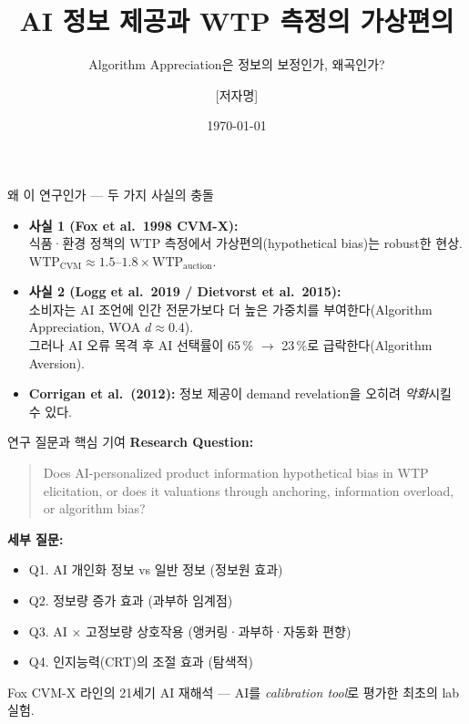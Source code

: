 \documentclass[aspectratio=169]{beamer}
\title{AI 정보 제공과 WTP 측정의 가상편의}
\subtitle{Algorithm Appreciation은 정보의 보정인가, 왜곡인가?}
\author{[저자명]}
\institute{[소속]}
\date{\today}
\begin{document}

\frame{\titlepage}

\begin{frame}{왜 이 연구인가 --- 두 가지 사실의 충돌}
  \begin{itemize}
    \item \textbf{사실 1 (Fox et al.\ 1998 CVM-X):}\\
      식품·환경 정책의 WTP 측정에서 가상편의(hypothetical bias)는 robust한 현상.\\
      $\mathrm{WTP}_{\text{CVM}} \approx 1.5\text{--}1.8 \times \mathrm{WTP}_{\text{auction}}$.
    \item \textbf{사실 2 (Logg et al.\ 2019 / Dietvorst et al.\ 2015):}\\
      소비자는 AI 조언에 인간 전문가보다 더 높은 가중치를 부여한다(Algorithm Appreciation, WOA $d \approx 0.4$).\\
      그러나 AI 오류 목격 후 AI 선택률이 65\,\% $\rightarrow$ 23\,\%로 급락한다(Algorithm Aversion).
    \item \textbf{Corrigan et al.\ (2012):} 정보 제공이 demand revelation을 오히려 \emph{악화}시킬 수 있다.
  \end{itemize}
  \vspace{0.4em}
\end{frame}

\begin{frame}{연구 질문과 핵심 기여}
  \textbf{Research Question:}
  \begin{quote}
    Does AI-personalized product information  hypothetical bias in WTP elicitation,
    or does it  valuations through anchoring, information overload, or algorithm bias?
  \end{quote}

  \textbf{세부 질문:}
  \begin{itemize}
    \item Q1. AI 개인화 정보 vs 일반 정보 (정보원 효과)
    \item Q2. 정보량 증가 효과 (과부하 임계점)
    \item Q3. AI $\times$ 고정보량 상호작용 (앵커링·과부하·자동화 편향)
    \item Q4. 인지능력(CRT)의 조절 효과 (탐색적)
  \end{itemize}

  \vspace{0.3em}
   Fox CVM-X 라인의 21세기 AI 재해석 --- AI를 \emph{calibration tool}로 평가한 최초의 lab 실험.
\end{frame}
\end{document}
